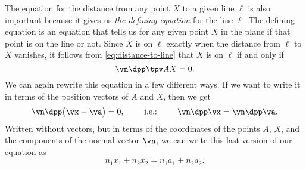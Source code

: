 The equation for the distance from any point $X$ to a given line $\ell$ is also
important because it gives us \emph{the defining equation} for the line $\ell$.
The defining equation is an equation that tells us for any given point $X$ in
the plane if that point is on the line or not.  Since $X$ is on $\ell$ exactly
when the distance from $\ell$ to $X$ vanishes, it follows from
\eqref{eq:distance-to-line} that $X$ is on $\ell$ if and only if 
\begin{equation}
  \vn\dpp\tpv AX = 0.
  \label{eq:defining-eqn-for-line}
\end{equation}
We can again rewrite this equation in a few different ways.  If we want to write
it in terms of the position vectors of $A$ and $X$, then we get
\[
  \vn \dpp \bigl(\vx-\va\bigr) = 0, \qquad
  \text{ i.e.: }\qquad
  \vn\dpp\vx = \vn\dpp\va.
\]
Written without vectors, but in terms of the coordinates of the points $A$,
$X$, and the components of the normal vector $\vn$, we can write this last
version of our equation as
\[
  n_1x_1+n_2x_2 = n_1a_1+n_2a_2.
\]



